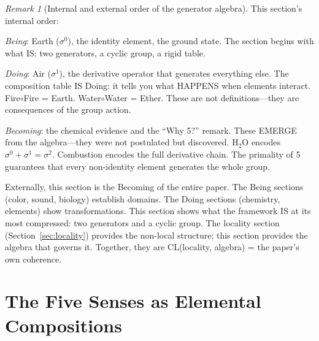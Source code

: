 \documentclass[11pt]{article}
\theoremstyle{definition}
\theoremstyle{remark}
\newtheorem{remark}[theorem]{Remark}
\begin{document}
\begin{remark}[Internal and external order of the generator algebra]
This section's internal order:

\emph{Being}: Earth ($\sigma^0$), the identity element, the ground state.
The section begins with what IS: two generators, a cyclic group, a rigid table.

\emph{Doing}: Air ($\sigma^1$), the derivative operator that generates
everything else.  The composition table IS Doing: it tells you what HAPPENS
when elements interact.  Fire$\circ$Fire = Earth.  Water$\circ$Water = Ether.
These are not definitions---they are consequences of the group action.

\emph{Becoming}: the chemical evidence and the ``Why 5?'' remark.  These
EMERGE from the algebra---they were not postulated but discovered.  H$_2$O
encodes $\sigma^0 + \sigma^1 = \sigma^2$.  Combustion encodes the full
derivative chain.  The primality of 5 guarantees that every non-identity
element generates the whole group.

Externally, this section is the Becoming of the entire paper.  The Being
sections (color, sound, biology) establish domains.  The Doing sections
(chemistry, elements) show transformations.  This section shows what the
framework IS at its most compressed: two generators and a cyclic group.
The locality section (Section~\ref{sec:locality}) provides the non-local
structure; this section provides the algebra that governs it.
Together, they are CL(locality, algebra) = the paper's own coherence.
\end{remark}

\section{The Five Senses as Elemental Compositions}
\label{sec:senses}
\end{document}
